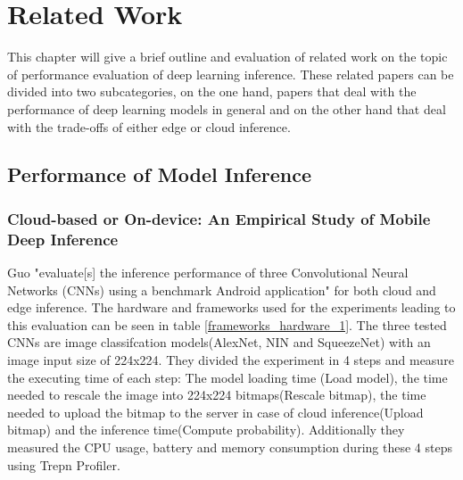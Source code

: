 \chapter{Related Work}
\label{chap:relatedWork}
This chapter will give a brief outline and evaluation of related work on the topic of performance evaluation of deep learning inference. These related papers can be divided into two subcategories, on the one hand, papers that deal with the performance of deep learning models in general and on the other hand that deal with the trade-offs of either edge or cloud inference.
\section{Performance of Model Inference}


\subsection{Cloud-based or On-device:
An Empirical Study of Mobile Deep Inference}
Guo "evaluate[s] the inference performance of three Convolutional Neural Networks
(CNNs) using a benchmark Android application" \cite{DBLP:conf/ic2e/Guo18} for both cloud and edge inference. The hardware and frameworks used for the experiments leading to this evaluation can be seen in table \ref{frameworks_hardware_1}. The three tested CNNs are image classifcation models(AlexNet, NIN and SqueezeNet) with an image input size of 224x224.
They divided the experiment in 4 steps and measure the executing time of each step: 
The model loading time (Load model), the time needed to rescale the image into 224x224 bitmaps(Rescale bitmap), the time needed to upload the bitmap to the server in case of cloud inference(Upload bitmap) and the inference time(Compute probability).
Additionally they measured the CPU usage, battery and memory consumption during these 4 steps using Trepn Profiler.


